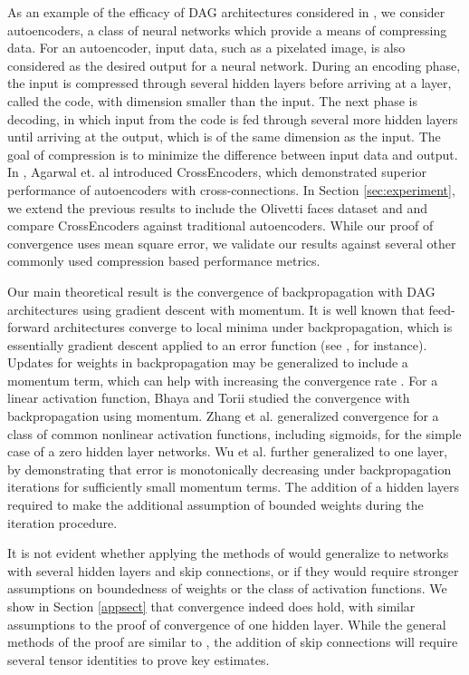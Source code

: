 \documentclass{jcmlatex}
\begin{document}
As an example of the efficacy of DAG architectures considered in \cite{huang2016densely}, we consider autoencoders, a class of neural networks which provide a means of compressing data. For an autoencoder, input data, such as a pixelated image, is also considered as the desired output for a neural network.  During an encoding phase, the input is compressed through several hidden layers before arriving at a layer, called the code, with dimension smaller than the input.  The next phase is decoding, in which input from the code is fed through several more hidden layers until arriving at the output, which is of the same dimension as the input.  The goal of compression is to minimize the difference between input data and output.  In \cite{agarwal2018crossencoder}, Agarwal et. al introduced CrossEncoders, which demonstrated superior performance of autoencoders with cross-connections. In Section \ref{sec:experiment}, we extend the previous results to include the Olivetti faces dataset and and compare  CrossEncoders against traditional autoencoders.  While our proof of convergence uses mean square error, we validate our results against several other commonly used compression based performance metrics.

Our main theoretical result is the convergence of backpropagation with DAG architectures using gradient descent with momentum.  It is well known that feed-forward architectures converge to local minima under backpropagation, which is  essentially gradient descent applied to an error function (see \cite{bishop1995neural}, for instance). Updates for weights in backpropagation may be generalized to include a momentum term, which can help with increasing the convergence rate \cite{rumelhart1987parallel}. For a linear activation function, Bhaya \cite{bhaya2004steepest} and Torii \cite{torii2002stability} studied the convergence with backpropagation using momentum. Zhang et al.\cite{zhang2006}  generalized convergence for a class of common nonlinear activation functions, including sigmoids, for the simple case of a zero hidden layer networks. Wu et al. \cite{wu2008convergence} further generalized to one layer, by demonstrating that error is monotonically decreasing under backpropagation iterations for sufficiently small momentum terms. The addition of a hidden layers required  \cite{wu2008convergence} to make the additional assumption of bounded weights during the iteration procedure. 

It is not evident whether applying the methods of \cite{wu2008convergence} would generalize to networks with several hidden layers and skip connections, or if they  would require stronger assumptions on boundedness of weights or the class of activation functions.  We show in Section \ref{appsect}  that convergence indeed does hold, with similar assumptions to the proof of convergence of one hidden layer.  While the general methods of the proof are similar to \cite{wu2008convergence}, the addition of skip connections will require several tensor identities to prove key estimates.
\end{document}
